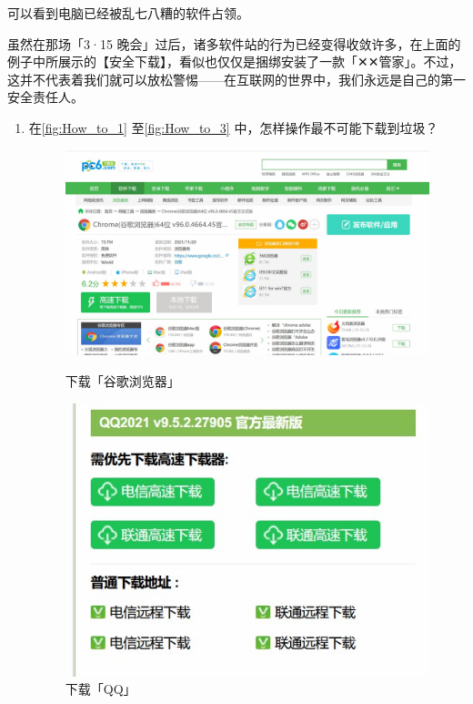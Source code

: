 {{可以看到电脑已经被乱七八糟的软件占领。

虽然在那场「3·15 晚会」过后，诸多软件站的行为已经变得收敛许多，在上面的例子中所展示的【安全下载】，看似也仅仅是捆绑安装了一款「✕✕管家」。不过，这并不代表着我们就可以放松警惕——在互联网的世界中，我们永远是自己的第一安全责任人。

\practice

\begin{enumerate}
  \item 在\autoref{fig:How_to_1} 至\autoref{fig:How_to_3} 中，怎样操作最不可能下载到垃圾？
  \begin{figure}[htb!]
    \centering
    \begin{minipage}{.6\textwidth}
      \centering
      \includegraphics[width=.9\textwidth]{assets/basic/How_to_1.jpg}
      \caption{下载「谷歌浏览器」}
      \label{fig:How_to_1}
    \end{minipage}
    \begin{minipage}{.39\textwidth}
      \centering
      \includegraphics[width=.8\textwidth]{assets/basic/How_to_2.jpg}
      \caption{下载「QQ」}
      \label{fig:How_to_2}
    \end{minipage}

\end{figure}
\end{enumerate}}}
